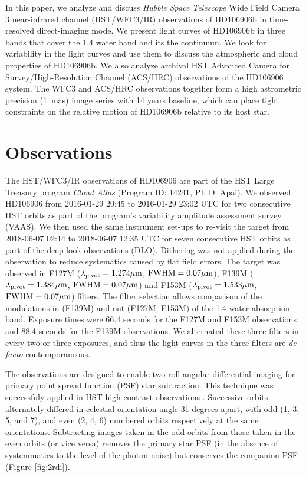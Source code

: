 \documentclass[twocolumn]{aastex62}
\begin{document}
In this paper, we analyze and discuss \emph{Hubble Space Telescope} Wide Field Camera 3 near-infrared channel (HST/WFC3/IR) observations of HD106906b in time-resolved direct-imaging mode. We present light curves of HD106906b in three bands that cover the 1.4\micron{} water band and its the continuum. We look for variability in the light curves and use them to discuss the atmospheric and cloud properties of HD106906b. We also analyze archival HST Advanced Camera for Survey/High-Resolution Channel (ACS/HRC) observations of the HD106906 system. The WFC3 and ACS/HRC observations together form a high astrometric precision (1~mas) image series with 14 years baseline,  which can place tight constraints on the relative motion of HD106906b relative to its host star.

\section{Observations}
The HST/WFC3/IR observations of HD106906 are part of the HST Large Treasury program \emph{Cloud Atlas} (Program ID: 14241, PI: D. Apai). We observed HD106906 from 2016-01-29 20:45 to 2016-01-29 23:02 UTC for two consecutive HST orbits as part of the program's variability amplitude assessment survey (VAAS). We then used the same instrument set-ups to re-visit the target from 2018-06-07 02:14 to 2018-06-07 12:35 UTC  for seven consecutive HST orbits as part of the deep look observations (DLO). Dithering was not applied during the observation to reduce systematics caused by flat field errors. The target was observed in F127M ($\lambda_{\mathrm{pivot}}=1.274\mbox{$\mu$m}$, $\mathrm{FWHM}=0.07\mbox{$\mu$m}$), F139M ($\lambda_{\mathrm{pivot}}=1.384\mbox{$\mu$m}$, $\mathrm{FWHM}=0.07\mbox{$\mu$m}$) and F153M ($\lambda_{\mathrm{pivot}}=1.533\mbox{$\mu$m}$, $\mathrm{FWHM}=0.07\mbox{$\mu$m}$) filters.  The filter selection allows comparison of the modulations  in (F139M) and out  (F127M, F153M) of the 1.4 \micron{} water absorption band.  Exposure times were 66.4 seconds for the F127M and F153M observations and 88.4 seconds for the F139M observations. We alternated these three filters in every two or three exposures, and thus the light curves in the three filters are \emph{de facto} {contemporaneous}. 

The observations are designed to enable two-roll angular differential imaging for primary point spread function (PSF) star subtraction.  This technique was successfuly applied in HST high-contrast observations \citep[e.g.,]{Zhou2016,Zhou2019}. {Successive orbits alternately differed in celestial orientation angle 31 degrees apart, with odd (1, 3, 5, and 7), and even (2, 4, 6) numbered orbits respectively at the same orientations.} Subtracting images  taken in the odd orbits from those  taken in the even orbits (or vice versa) removes the primary star PSF (in the absence of systemmatics to the level of the photon noise) but conserves the companion PSF (Figure \ref{fig:2rdi}).  
\end{document}
